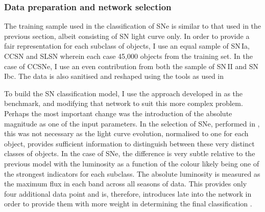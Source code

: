 \subsubsection{Data preparation and network selection} \label{sec:SNClassificationNetwork}
The training sample used in the classification of SNe is similar to that used in the previous section, albeit consisting of SN light curve only. In order to provide a fair representation for each subclass of objects, I use an equal sample of SN\,Ia, CCSN and SLSN wherein each case 45,000 objects from the training set. In the case of CCSNe, I use an even contribution from both the sample of SN\,II and SN\,Ibc. The data is also sanitised and reshaped using the tools as used in 

To build the SN classification model, I use the approach developed in  as the benchmark, and modifying that network to suit this more complex problem. Perhaps the most important change was the introduction of the absolute magnitude as one of the input parameters. In the selection of SNe, performed in , this was not necessary as the light curve evolution, normalised to one for each object, provides sufficient information to distinguish between these very distinct classes of objects. In the case of SNe, the difference is very subtle relative to the previous model with the luminosity as a function of the colour likely being one of the strongest indicators for each subclass. The absolute luminosity is measured as the maximum flux in each band across all seasons of data. This provides only four additional data point and is, therefore, introduces late into the network in order to provide them with more weight in determining the final classification .

